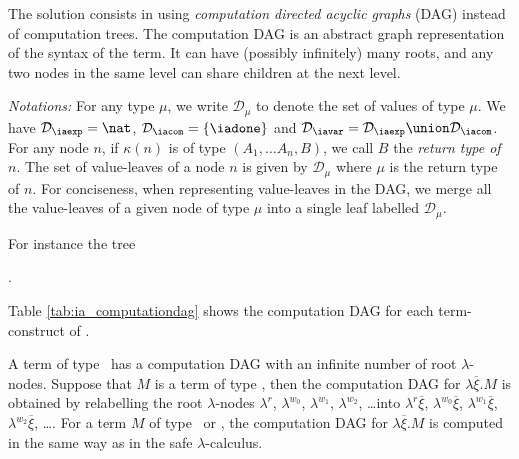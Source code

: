 The solution consists in using \emph{computation directed acyclic graphs} (DAG) instead of computation trees. The computation DAG is an abstract graph representation of the syntax of the term.
It can have (possibly infinitely) many roots, and any two nodes in the same level can share children at the next level.

\emph{Notations:} For any type $\mu$, we write
$\mathcal{D}_\mu$ to denote the set of values of type $\mu$.
We have $\mathcal{D}_{\iaexp} = \nat$,
$\mathcal{D}_{\iacom} = \{ \iadone \}$
and $\mathcal{D}_{\iavar} = \mathcal{D}_{\iaexp} \union \mathcal{D}_{\iacom}$. For any node $n$, if $\kappa(n)$ is of type $(A_1,\ldots A_n,B)$, we call $B$ the \emph{return type of $n$}. The set of value-leaves of a node $n$ is given by $\mathcal{D}_{\mu}$ where $\mu$ is the return type of $n$.
For conciseness, when representing value-leaves in the DAG, we merge all the value-leaves of a given node of type $\mu$ into a single leaf labelled $\mathcal{D}_\mu$.

For instance the tree
\begin{center}
.
\end{center}

Table \ref{tab:ia_computationdag} shows the computation DAG for each term-construct of \ialgol.

A term of type \iavar\ has a computation DAG with an infinite number of root $\lambda$-nodes. Suppose that $M$ is a term of type \iavar, then the computation DAG for $\lambda \overline{\xi} . M$ is obtained by relabelling the root $\lambda$-nodes $\lambda^r$,
$\lambda^{w_0}$, $\lambda^{w_1}$, $\lambda^{w_2}$, \ldots into
$\lambda^r \overline{\xi}$, $\lambda^{w_0} \overline{\xi}$,
$\lambda^{w_1} \overline{\xi}$, $\lambda^{w_2} \overline{\xi}$,
\ldots. For a term $M$  of type \iaexp\ or \iacom, the computation
DAG for $\lambda \overline{\xi} . M$ is computed in the same way as
in the safe $\lambda$-calculus.

